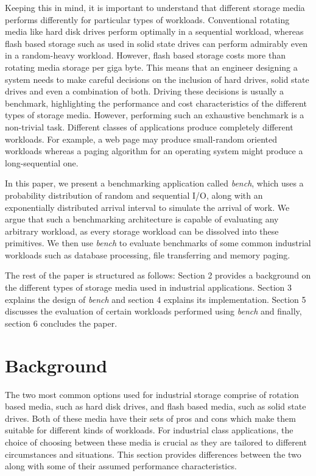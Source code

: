 \documentclass[10pt, author, twocolumn]{article}
\begin{document}
Keeping this in mind, it is important to understand that different storage media performs differently for particular types of workloads. Conventional rotating media like hard disk drives perform optimally in a sequential workload, whereas flash based storage such as used in solid state drives can perform admirably even in a random-heavy workload. However, flash based storage costs more than rotating media storage per giga byte. This means that an engineer designing a system needs to make careful decisions on the inclusion of hard drives, solid state drives and even a combination of both. Driving these decisions is usually a benchmark, highlighting the performance and cost characteristics of the different types of storage media. However, performing such an exhaustive benchmark is a non-trivial task. Different classes of applications produce completely different workloads. For example, a web page may produce small-random oriented workloads whereas a paging algorithm for an operating system might produce a long-sequential one.

In this paper, we present a benchmarking application called \textit{bench}, which uses a probability distribution of random and sequential I/O, along with an exponentially distributed arrival interval to simulate the arrival of work. We argue that such a benchmarking architecture is capable of evaluating any arbitrary workload, as every storage workload can be dissolved into these primitives. We then use \textit{bench} to evaluate benchmarks of some common industrial workloads such as database processing, file transferring and memory paging. 

The rest of the paper is structured as follows: Section 2 provides a background on the different types of storage media used in industrial applications. Section 3 explains the design of \textit{bench} and section 4 explains its implementation. Section 5 discusses the evaluation of certain workloads performed using \textit{bench} and finally, section 6 concludes the paper.

\section{Background}

The two most common options used for industrial storage comprise of rotation based media, such as hard disk drives, and flash based media, such as solid state drives. Both of these media have their sets of pros and cons which make them suitable for different kinds of workloads. For industrial class applications, the choice of choosing between these media is crucial as they are tailored to different circumstances and situations. This section provides differences between the two along with some of their assumed performance characteristics. 
\end{document}

